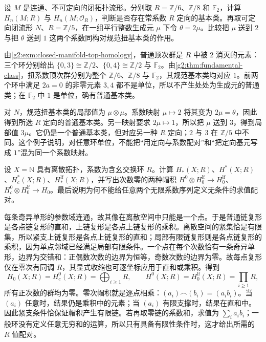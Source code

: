 \begin{exercise}\label{g2:ex:ring-orientation-units}
	设 \(M\) 是连通、不可定向的闭拓扑流形。分别取 \(R=\mathbb Z/6\)、\(\mathbb Z/8\) 和 \(\mathbb F_2\)，计算 \(H_n(M;R)\) 与 \(H_n(M;\mathcal O_R)\)，判断是否存在常系数 \(R\) 定向的基本类。再取可定向闭流形 \(N\)、\(R=\mathbb Z/5\)，在一组平行整数生成元 \(\mu\) 下令 \(\theta=2\mu\)。比较把 \(\mu\) 送到 \(2\) 与把 \(\theta\) 送到 \(1\) 这两个系数同构对规范扭基本类的作用。
\end{exercise}
\begin{solution}
	由\cref{g2:exm:closed-manifold-top-homology}，普通顶次群是 \(R\) 中被 \(2\) 消灭的元素：三个环分别给出 \(\{0,3\}\cong\mathbb Z/2\)、\(\{0,4\}\cong\mathbb Z/2\) 与 \(\mathbb F_2\)。由\cref{g2:thm:fundamental-class}，扭系数顶次群分别为整个 \(\mathbb Z/6\)、\(\mathbb Z/8\) 与 \(\mathbb F_2\)，其规范基本类均对应 \(1\)。前两个环中满足 \(2a=0\) 的非零元素 \(3,4\) 都不是单位，所以不产生处处为生成元的普通类；在 \(\mathbb F_2\) 中 \(1\) 是单位，确有普通基本类。

	对 \(N\)，规范扭基本类的局部值为 \(\mu\otimes\mu\)。系数映射 \(\mu\mapsto2\) 将其变为 \(2\mu=\theta\)，因此得到所选 \(R\) 定向的普通基本类。另一映射要求 \(2\mu\mapsto1\)，所以把 \(\mu\) 送到 \(3\)，得到局部值 \(3\mu\)。它仍是一个普通基本类，但对应另一种 \(R\) 定向；\(2\) 与 \(3\) 在 \(\mathbb Z/5\) 中不同。这个例子说明，对任意环单位，不能把“用定向与系数配对”和“把定向基元写成 \(1\)”混为同一个系数映射。
\end{solution}

\begin{exercise}\label{g2:ex:discrete-support-theories}
	设 \(X=\mathbb N\) 具有离散拓扑，系数为含幺交换环 \(R\)。计算 \(H_*(X;R)\)、\(H^*(X;R)\)、\(H_c^*(X;R)\)、\(H_*^{\mathrm{lf}}(X;R)\)，并写出次数零的两种帽积 \(H^0\otimes H_0^{\mathrm{lf}}\to H_0^{\mathrm{lf}}\)、\(H_c^0\otimes H_0^{\mathrm{lf}}\to H_0\)。最后说明为何不能给任意两个无限系数序列定义无条件的求值配对。
\end{exercise}
\begin{solution}
	每条奇异单形的参数域连通，故其像在离散空间中只能是一个点。于是普通链复形是各点链复形的直和，上链复形是各点上链复形的乘积。离散空间的紧集恰是有限集，所以紧支上链复形是各点上链复形的直和；局部有限链复形则是各点链复形的乘积，因为单点邻域已经满足局部有限条件。一个点在每个次数恰有一条奇异单形，边界为交错和：正偶数次数的边界为恒等，奇数次数的边界为零。故每点复形仅在零次有同调 \(R\)，其显式收缩也可逐坐标应用于直和或乘积。得到
	\[
		H_0(X;R)=H_c^0(X;R)=\bigoplus_{i\ge1}R,
		\qquad H^0(X;R)=H_0^{\mathrm{lf}}(X;R)=\prod_{i\ge1}R,
	\]
	所有正次数的群均为零。零次帽积就是逐点相乘：\((a_i)\frown(b_i)=(a_ib_i)\)。当 \((a_i)\) 任意时，结果仍是乘积中的元素；当 \((a_i)\) 有限支撑时，结果在直和中。因此紧支条件恰保证帽积产生有限链。若再取零链的系数和，求值为 \(\sum_i a_ib_i\)；一般环没有定义任意无穷和的运算，所以只有具备有限性条件时，这才给出所需的 \(R\) 值配对。
\end{solution}

